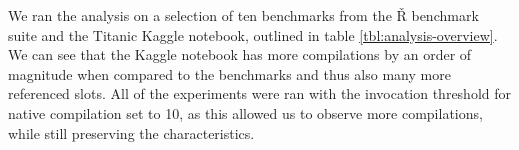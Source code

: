 \begin{table}[t]
  \caption{Overview of analyzed programs}\label{tbl:analysis-overview}
\end{table}

We ran the analysis on a selection of ten benchmarks from the Ř benchmark suite and the Titanic Kaggle notebook, outlined in table \ref{tbl:analysis-overview}. We can see that the Kaggle notebook has more compilations by an order of magnitude when compared to the benchmarks and thus also many more referenced slots. All of the experiments were ran with the invocation threshold for native compilation set to 10, as this allowed us to observe more compilations, while still preserving the characteristics.

